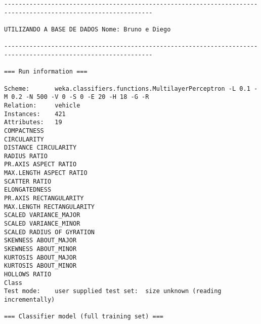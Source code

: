 \documentclass[
	article,			%
	11pt,				%
	oneside,			%
	a4paper,			%
	english,			%
	brazil,				%
	sumario=tradicional
	]{abntex2}
\begin{document}
\begin{lstlisting}
---------------------------------------------------------------------------------------------------------------

UTILIZANDO A BASE DE DADOS Nome: Bruno e Diego

---------------------------------------------------------------------------------------------------------------

=== Run information ===

Scheme:       weka.classifiers.functions.MultilayerPerceptron -L 0.1 -M 0.2 -N 500 -V 0 -S 0 -E 20 -H 18 -G -R
Relation:     vehicle
Instances:    421
Attributes:   19
COMPACTNESS
CIRCULARITY
DISTANCE CIRCULARITY
RADIUS RATIO
PR.AXIS ASPECT RATIO
MAX.LENGTH ASPECT RATIO
SCATTER RATIO
ELONGATEDNESS
PR.AXIS RECTANGULARITY
MAX.LENGTH RECTANGULARITY
SCALED VARIANCE_MAJOR
SCALED VARIANCE_MINOR
SCALED RADIUS OF GYRATION
SKEWNESS ABOUT_MAJOR
SKEWNESS ABOUT_MINOR
KURTOSIS ABOUT_MAJOR
KURTOSIS ABOUT_MINOR
HOLLOWS RATIO
Class
Test mode:    user supplied test set:  size unknown (reading incrementally)

=== Classifier model (full training set) ===


\end{lstlisting}
\end{document}
